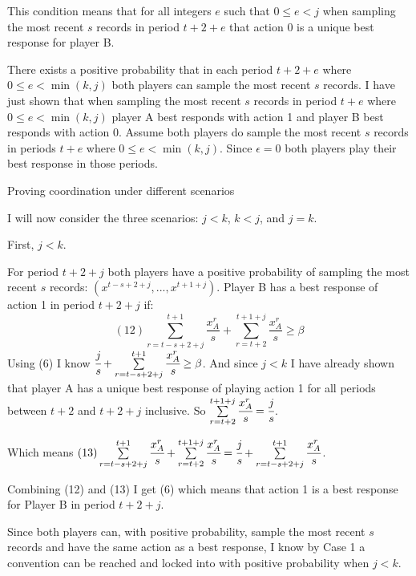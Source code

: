 \documentclass{article}
\begin{document}
This condition means that for all integers $e$ such that $0 \leq e<j$ when sampling the most recent $s$ records in period $t+2+e$ that action 0 is a unique best response for player B.

\vskip12pt

There exists a positive probability that in each period $t+2+e$ where $0 \leq e<\min (k,j)$ both players can sample the most recent $s$ records. I have just shown that when sampling the most recent $s$ records in period $t+e$ where $0 \leq e<\min (k,j)$ player A best responds with action 1 and player B best responds with action 0. Assume both players do sample the most recent $s$ records in periods $t+e$ where $0 \leq e<\min (k,j)$. Since $\epsilon=0$ both players play their best response in those periods.

\vskip12pt

\centering

Proving coordination under different scenarios

\vskip6pt

\raggedright

I will now consider the three scenarios: $j<k$, $k<j$, and $j=k$.

\vskip12pt

First, $j<k$. 

\vskip6pt

For period $t+2+j$ both players have a positive probability of sampling the most recent $s$ records: $(x^{t-s+2+j},...,x^{t+1+j})$. Player B has a best response of action 1 in period $t+2+j$ if:
$$(12) \sum\limits_{r=t-s+2+j}^{t+1}\frac{x^r_A}{s}+\sum\limits_{r=t+2}^{t+1+j} \frac{x^r_A}{s} \geq \beta$$
Using (6) I know $\cfrac{j}{s}+\sum\limits_{r=t-s+2+j}^{t+1}\cfrac{x^r_A}{s} \geq \beta$. And since $j<k$ I have already shown that player A has a unique best response of playing action 1 for all periods between $t+2$ and $t+2+j$ inclusive. So $\sum\limits_{r=t+2}^{t+1+j} \cfrac{x^r_A}{s}=\cfrac{j}{s}$.

Which means $(13) \sum\limits_{r=t-s+2+j}^{t+1}\cfrac{x^r_A}{s}+\sum\limits_{r=t+2}^{t+1+j} \cfrac{x^r_A}{s}=\cfrac{j}{s}+\sum\limits_{r=t-s+2+j}^{t+1}\cfrac{x^r_A}{s}$.

Combining (12) and (13) I get (6) which means that action 1 is a best response for Player B in period $t+2+j$.

\vskip6pt

Since both players can, with positive probability, sample the most recent $s$ records and have the same action as a best response, I know by Case 1 a convention can be reached and locked into with positive probability when $j<k$.
\end{document}
